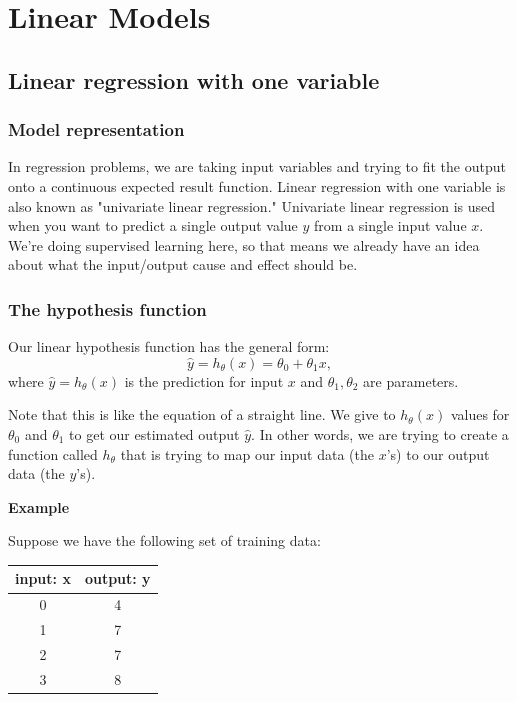 \documentclass[a4paper,11pt]{report}
\begin{document}
\chapter{Linear Models}

\section{Linear regression with one variable}

\subsection*{Model representation}

In regression problems, we are taking input variables and trying to fit the output onto a continuous expected result function. Linear regression with one variable is also known as "univariate linear regression."
Univariate linear regression is used when you want to predict a single output value $y$ from a single input value $x$. We're doing supervised learning here, so that means we already have an idea about what the input/output cause and effect should be.

\subsection*{The hypothesis function}

Our linear hypothesis function has the general form:
\begin{equation}\label{eq:lin-reg-hyp}
\hat{y} = h_\theta(x) = \theta_0 + \theta_1x,
\end{equation}
where $\hat{y} = h_\theta(x)$ is the prediction for input $x$ and $\theta_1, \theta_2$ are parameters.

Note that this is like the equation of a straight line. We give to $h_\theta(x)$ values for $\theta_0$ and $\theta_1$ to get our estimated output $\hat{y}$. In other words, we are trying to create a function called $h_\theta$ that is trying to map our input data (the $x$'s) to our output data (the $y$'s).

\textbf{Example}

Suppose we have the following set of training data:

\begin{center}
\begin{tabular}{ |c|c| }
 \hline
 input: x & output: y \\
 \hline
 0 & 4 \\ 1 & 7 \\ 2 & 7 \\ 3 & 8 \\
 \hline
\end{tabular}
\end{center}
\end{document}
